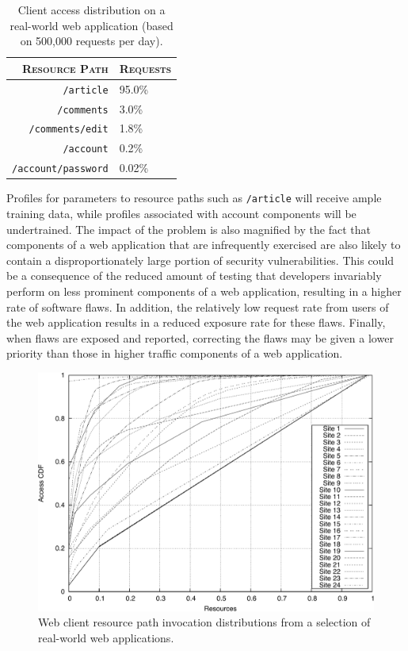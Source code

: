 \begin{table}[t]
  \centering
  \begin{tabular}{rl}
    \toprule
    \textsc{Resource Path} & \textsc{Requests}\\
    \midrule

    \texttt{/article} & 95.0\% \\
    \texttt{/comments} & 3.0\% \\
    \texttt{/comments/edit} & 1.8\% \\
    \texttt{/account} & 0.2\% \\
    \texttt{/account/password} & 0.02\%\\
    \bottomrule
  \end{tabular}

  \caption{Client access distribution on a real-world web application (based on 500,000 requests per day).}
  \label{tab:client-access-distribution}
\end{table}

Profiles for parameters to resource paths such as \texttt{/article} will receive ample training data, while profiles associated with account components will be undertrained. The impact of the problem is also magnified by the fact that components of a web application that are infrequently exercised are also likely to contain a disproportionately large portion of security vulnerabilities.  This could be a consequence of the reduced amount of testing that developers invariably perform on less prominent components of a web application, resulting in a higher rate of software flaws.  In addition, the relatively low request rate from users of the web application results in a reduced exposure rate for these flaws.  Finally, when flaws are exposed and reported, correcting the flaws may be given a lower priority than those in higher traffic components of a web application.

\begin{figure}[t]
  \centering
  \includegraphics[width=.85\textwidth]{figures/web/longtail/fig_long_tail}
  \caption{Web client resource path invocation distributions from a
    selection of real-world web applications.}
  \label{fig:long_tail}
\end{figure}

